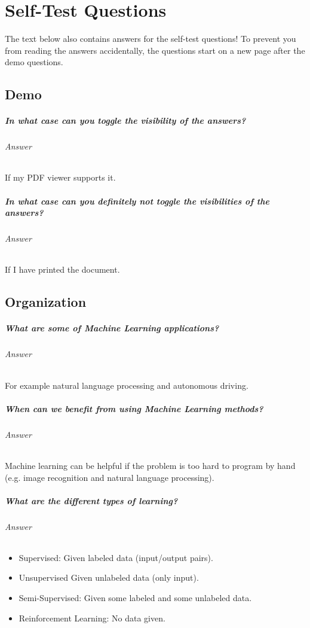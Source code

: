 \documentclass[a4paper, 11pt, accentcolor = tud3b]{tudreport}
\newcommand{\answer}[1]{\subparagraph{Answer} #1}
\begin{document}
	\appendix

	\chapter{Self-Test Questions}
		The text below also contains answers for the self-test questions! To prevent you from reading the answers accidentally, the questions start on a new page after the demo questions.

		\section{Demo}
			\paragraph{In what case can you toggle the visibility of the answers?}
			\answer{If my PDF viewer supports it.}

			\paragraph{In what case can you definitely not toggle the visibilities of the answers?}
			\answer{If I have printed the document.}
		
		\newpage

		\section{Organization}
			\paragraph{What are some of Machine Learning applications?}
			\answer{For example natural language processing and autonomous driving.}

			\paragraph{When can we benefit from using Machine Learning methods?}
			\answer{Machine learning can be helpful if the problem is too hard to program by hand (e.g. image recognition and natural language processing).}

			\paragraph{What are the different types of learning?}
			\answer{
				\begin{itemize}
					\item Supervised: Given labeled data (input/output pairs).
					\item Unsupervised Given unlabeled data (only input).
					\item Semi-Supervised:  Given some labeled and some unlabeled data.
					\item Reinforcement Learning: No data given.
				\end{itemize}
			}
\end{document}
